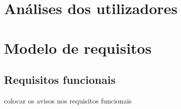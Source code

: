 \documentclass[11pt, twoside]{report}
\begin{document}
 	

	\chapter{Análises dos utilizadores}
	
	\chapter{Modelo de requisitos}
	\section{Requisitos funcionais}
	
	

	\pagebreak %
	
	
	colocar os avisos nos requisitos funcionais
	
\end{document}
